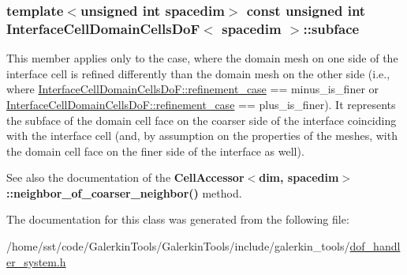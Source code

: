 \subsubsection[{\texorpdfstring{subface}{subface}}]{\setlength{\rightskip}{0pt plus 5cm}template$<$unsigned int spacedim$>$ const unsigned int {\bf Interface\+Cell\+Domain\+Cells\+DoF}$<$ spacedim $>$\+::subface}\hypertarget{class_interface_cell_domain_cells_do_f_ac0f33cbe60afdc4f5856ea39a085ed1a}{}\label{class_interface_cell_domain_cells_do_f_ac0f33cbe60afdc4f5856ea39a085ed1a}
This member applies only to the case, where the domain mesh on one side of the interface cell is refined differently than the domain mesh on the other side (i.\+e., where \hyperlink{class_interface_cell_domain_cells_do_f_aebb7e5f13d079fc83f98f67bcfcc6de3}{Interface\+Cell\+Domain\+Cells\+Do\+F\+::refinement\+\_\+case} == {\ttfamily minus\+\_\+is\+\_\+finer} or \hyperlink{class_interface_cell_domain_cells_do_f_aebb7e5f13d079fc83f98f67bcfcc6de3}{Interface\+Cell\+Domain\+Cells\+Do\+F\+::refinement\+\_\+case} == {\ttfamily plus\+\_\+is\+\_\+finer}). It represents the subface of the domain cell face on the coarser side of the interface coinciding with the interface cell (and, by assumption on the properties of the meshes, with the domain cell face on the finer side of the interface as well).

See also the documentation of the {\bf Cell\+Accessor$<$dim, spacedim$>$\+::neighbor\+\_\+of\+\_\+coarser\+\_\+neighbor()} method. 

The documentation for this class was generated from the following file\+:\begin{DoxyCompactItemize}
\item 
/home/sst/code/\+Galerkin\+Tools/\+Galerkin\+Tools/include/galerkin\+\_\+tools/\hyperlink{dof__handler__system_8h}{dof\+\_\+handler\+\_\+system.\+h}\end{DoxyCompactItemize}
